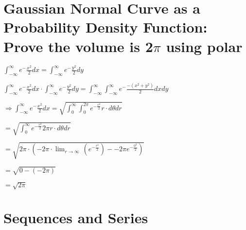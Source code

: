 \documentclass{article}
\begin{document}
\section{Gaussian Normal Curve as a Probability Density Function: Prove the volume is 2$\pi$ using polar}

    $\int_{-\infty}^{\infty} e^-\frac{x^2}{2} dx = \int_{-\infty}^{\infty} e^-\frac{y^2}{2} dy $

    $\int_{-\infty}^{\infty} e^-\frac{x^2}{2} dx \cdot \int_{-\infty}^{\infty} e^-\frac{y^2}{2} dy = \int_{-\infty}^{\infty} \int_{-\infty}^{\infty} e^-\frac{-(x^2+y^2)}{2} dx dy $

    $\Rightarrow \int_{-\infty}^{\infty} e^-\frac{x^2}{2} dx = \sqrt{\int_{0}^{\infty} \int_{0}^{2\pi} e^{-\frac{r^2}{2}} r \cdot d\theta dr }$

    $ = \sqrt{\int_{0}^{\infty} e^{-\frac{r^2}{2}} 2\pi r \cdot d\theta dr} $

    $ = \sqrt{2\pi \cdot (-2\pi \cdot \lim _{r\to \infty \:}\left(e^{-\frac{r^2}{2}}\right) - -2\pi e^{-\frac{0^2}{2}})}$

    $ = \sqrt{0-\left(-2\pi \right)}$

    $ = \sqrt{2\pi}$

\section{Sequences and Series}
\end{document}

